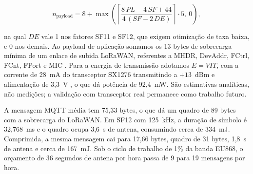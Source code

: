 \documentclass[12pt]{article}
\begin{document}
\begin{equation}
n_{\text{payload}} = 8 + \max\left(
\left\lceil \frac{8\,PL - 4\,SF + 44}{4\,(SF - 2\,DE)} \right\rceil \cdot 5,\ 0
\right),
\end{equation}

na qual $DE$ vale 1 nos fatores SF11 e SF12, que exigem otimização de taxa
baixa, e 0 nos demais. Ao payload de aplicação somamos os 13 bytes de sobrecarga
mínima de um enlace de subida LoRaWAN, referentes a MHDR, DevAddr, FCtrl, FCnt,
FPort e MIC \cite{loraalliance:18a}. Para a energia de transmissão adotamos
$E = V I T$, com a corrente de 28~mA do transceptor SX1276 transmitindo a
$+13$~dBm e alimentação de 3,3~V \cite{semtech:20}, o que dá potência de
92,4~mW. São estimativas analíticas, não medições; a validação com transceptor
real permanece como trabalho futuro.

A mensagem MQTT média tem 75,33 bytes, o que dá um quadro de 89 bytes com a
sobrecarga do LoRaWAN. Em SF12 com 125~kHz, a duração de símbolo é 32,768~ms e o
quadro ocupa 3,6~s de antena, consumindo cerca de 334~mJ. Comprimida, a mesma
mensagem cai para 17,66 bytes, quadro de 31 bytes, 1,8~s de antena e cerca de
167~mJ. Sob o ciclo de trabalho de 1\% da banda EU868, o orçamento de 36
segundos de antena por hora passa de 9 para 19 mensagens por hora.
\end{document}
